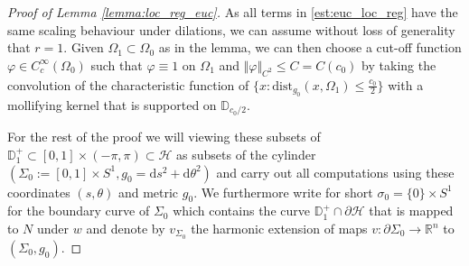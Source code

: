 \documentclass[10pt,reqno]{amsart}
\theoremstyle{plain}
\theoremstyle{definition}
\numberwithin{equation}{section}
\newcommand{\Om}{\Omega}
\newcommand{\si}{\sigma}
\newcommand{\Si}{\Sigma}
\newcommand{\vph}{\varphi}
\newcommand{\R}{\ensuremath{{\mathbb R}}}
\newcommand{\norm}[1]{\Vert#1\Vert}
\newcommand{\dd}{\mathrm{d}} %
\newcommand{\dist}{\text{dist}}
\newcommand{\HH}{\mathcal{H}} %
\newcommand{\DD}{\mathbb{D}}
\newcommand{\p}{\partial} %
\begin{document}
\begin{proof}[Proof of Lemma \ref{lemma:loc_reg_euc}]
    As all terms in \eqref{est:euc_loc_reg} have the same scaling behaviour  under dilations, we can assume without loss of generality that $r=1$.  Given $\Om_1\subset \Om_0$ as in the lemma, we can then choose a  cut-off function $\vph\in C_c^\infty(\Om_0) $ such that $\vph \equiv 1$ on $\Omega_1$ and $\norm{ \vph}_{C^2} \leq C =C(c_0)$ by taking the convolution of the characteristic function of $\{x : \dist_{g_0}(x,\Omega_1) \leq \tfrac{c_0}{2}\}$ with a mollifying kernel that is supported on $\DD_{c_0/2}$.

    For the rest of the proof we will viewing these subsets of $\DD_1^+\subset  [0,1]\times (-\pi,\pi)\subset \HH$ as subsets of the cylinder $(\Si_0:= [0,1]\times S^1, g_0=  \dd s^2 + \dd \theta^2)$ and carry out all computations using these coordinates $(s,\theta)$ and metric $g_0$. We furthermore write for short $\si_0 = \{0\}\times S^1$ for the boundary curve of $\Si_0$ which contains the curve $\DD_1^+\cap \p\HH$ that is mapped to $N$ under $w$ and denote by $v_{\Si_0}$ the harmonic extension of maps $v:\partial \Si_0\to \R^n$ to $(\Si_0,g_0)$. 


\end{proof}
\end{document}
